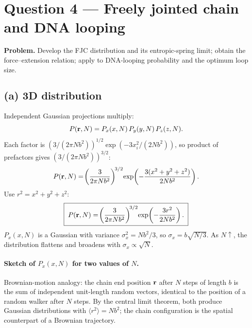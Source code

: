 \documentclass[11pt]{article}
\begin{document}
\section*{Question 4 --- Freely jointed chain and DNA looping}

\textbf{Problem.} Develop the FJC distribution and its entropic-spring limit; obtain the force--extension relation; apply to DNA-looping probability and the optimum loop size.

\subsection*{(a) 3D distribution}

Independent Gaussian projections multiply:
\[ P(\vb r,N) = P_x(x,N)\,P_y(y,N)\,P_z(z,N). \]
Each factor is $(3/(2\pi Nb^2))^{1/2}\exp(-3x_i^2/(2Nb^2))$, so product of prefactors gives $(3/(2\pi Nb^2))^{3/2}$:
\[ P(\vb r,N) = \!\left(\frac{3}{2\pi N b^2}\right)^{\!3/2}\!\exp\!\left(-\frac{3(x^2+y^2+z^2)}{2 N b^2}\right). \]
Use $r^2 = x^2+y^2+z^2$:
\[ \boxed{\;P(\vb r,N) = \!\left(\frac{3}{2\pi N b^2}\right)^{\!3/2}\!\exp\!\left(-\frac{3 r^2}{2 N b^2}\right).\;} \]
$P_x(x,N)$ is a Gaussian with variance $\sigma_x^2 = Nb^2/3$, so $\sigma_x = b\sqrt{N/3}$. As $N\uparrow$, the distribution flattens and broadens with $\sigma_x\propto\sqrt{N}$.

\paragraph{Sketch of $P_x(x,N)$ for two values of $N$.}
\begin{center}
\end{center}

Brownian-motion analogy: the chain end position $\vb r$ after $N$ steps of length $b$ is the sum of independent unit-length random vectors, identical to the position of a random walker after $N$ steps. By the central limit theorem, both produce Gaussian distributions with $\langle r^2\rangle = Nb^2$; the chain configuration is the spatial counterpart of a Brownian trajectory.
\end{document}
